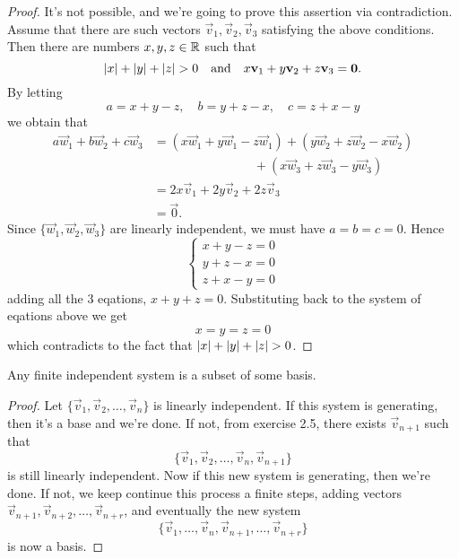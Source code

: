 \begin{proof}
  It's not possible, and we're going to prove this assertion via contradiction.
  Assume that there are such vectors $\vec{v}_1,\vec{v}_2,\vec{v}_3$
  satisfying the above conditions. Then there are numbers $x,y,z\in\mathbb{R}$
  such that
  \[
    \lvert x\rvert+\lvert y\rvert+\lvert z\rvert>0
    \quad\text{and}\quad
    x\mathbf{v}_1+y\mathbf{v}_2+z\mathbf{v}_3=\mathbf{0}.
  \]
  By letting 
  \[a=x+y-z,\quad b=y+z-x,\quad c=z+x-y\]
  we obtain that
  \begin{align*}
    a\vec{w}_1+b\vec{w}_2+c\vec{w}_3
    &=(x\vec{w}_1+y\vec{w}_1-z\vec{w}_1)
     +(y\vec{w}_2+z\vec{w}_2-x\vec{w}_2)\\
    &\qquad\qquad\qquad\qquad +(x\vec{w}_3+z\vec{w}_3-y\vec{w}_3)\\
    &=2x\vec{v}_1+2y\vec{v}_2+2z\vec{v}_3\\
    &=\vec{0}.
  \end{align*}
  Since $\{\vec{w}_1,\vec{w}_2,\vec{w}_3\}$
  are linearly independent, we must have $a=b=c=0$. Hence
  \[
    \begin{cases}
      x+y-z=0\\
      y+z-x=0\\
      z+x-y=0
    \end{cases}
  \]
  adding all the 3 eqations, $x+y+z=0$. Substituting back to the 
  system of eqations above we get
  \[x=y=z=0\]
  which contradicts to the fact that $\lvert x\rvert+\lvert y\rvert+\lvert z\rvert>0$.
\end{proof}
\begin{exercise}
  Any finite independent system is a subset of some basis.
\end{exercise}
\begin{proof}
  Let $\{\vec{v}_1,\vec{v}_2,\dots,\vec{v}_n\}$ is linearly independent.
  If this system is generating, then it's a base and we're done. If not,
  from exercise 2.5, there exists $\vec{v}_{n+1}$ such that
  \[\{\vec{v}_1,\vec{v}_2,\dots,\vec{v}_n,\vec{v}_{n+1}\}\]
  is still linearly independent. Now if this new system is generating, then 
  we're done. If not, we keep continue this process a finite steps, 
  adding vectors $\vec{v}_{n+1},\vec{v}_{n+2},\dots,\vec{v}_{n+r}$, and 
  eventually the new system
  \[\{\vec{v}_1,\dots,\vec{v}_{n},\vec{v}_{n+1},\dots,\vec{v}_{n+r}\}\]
  is now a basis.
\end{proof}
